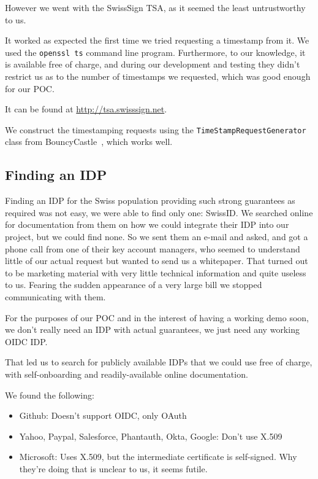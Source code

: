 However we went with the SwissSign \gls{TSA}, as it seemed the least untrustworthy to us.

It worked as expected the first time we tried requesting a timestamp from it.
We used the \texttt{openssl ts} command line program.
Furthermore, to our knowledge, it is available free of charge,
and during our development and testing they didn't restrict us as to the number of timestamps we requested,
which was good enough for our \gls{POC}.

It can be found at \url{http://tsa.swisssign.net}.

We construct the timestamping requests using the \texttt{TimeStampRequestGenerator} class from BouncyCastle~\cite{timestamprequestgenerator},
which works well.

\subsection{Finding an IDP}\label{sec:finding-an-idp}
Finding an \gls{IDP} for the Swiss population providing such strong guarantees as required was not easy,
we were able to find only one: SwissID.
We searched online for documentation from them on how we could integrate their \gls{IDP} into our project,
but we could find none.
So we sent them an e-mail and asked, and got a phone call from one of their key account managers,
who seemed to understand little of our actual request but wanted to send us a whitepaper.
That turned out to be marketing material with very little technical information and quite useless to us.
Fearing the sudden appearance of a very large bill we stopped communicating with them.

For the purposes of our \gls{POC} and in the interest of having a working demo soon,
we don't really need an \gls{IDP} with actual guarantees, we just need any working \gls{OIDC} \gls{IDP}.

That led us to search for publicly available \gls{IDP}s that we could use free of charge,
with self-onboarding and readily-available online documentation.

We found the following:
\begin{itemize}
    \item Github: Doesn't support \gls{OIDC}, only OAuth
    \item Yahoo, Paypal, Salesforce, Phantauth, Okta, Google: Don't use X.509
    \item Microsoft: Uses X.509, but the intermediate certificate is self-signed. Why they're doing that is unclear to us, it seems futile.
\end{itemize}

